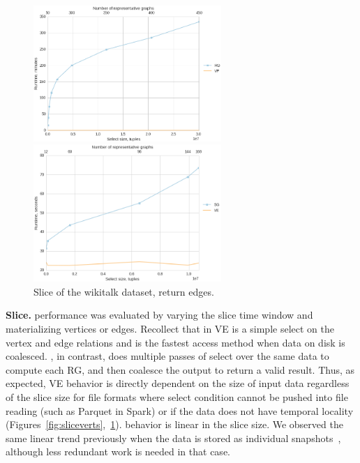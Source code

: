 \begin{figure}
\centering
\begin{minipage}{3.3in}
\centering
\includegraphics[width=2.8in]{figs/slice_ngrams_vertices_build11.png}
\caption{Slice of the nGrams dataset, return vertices.}
\label{fig:sliceverts}
\end{minipage}
\begin{minipage}{3.3in}
\centering
\includegraphics[width=2.8in]{figs/slice_wikitalk_edges_build11.png}
\caption{Slice of the wikitalk dataset, return edges.}
\label{fig:sliceedges}
\end{minipage}
\end{figure}

{\bf Slice.}   performance was evaluated by varying the
slice time window and materializing vertices or edges.  Recollect that
in VE  is a simple select on the vertex and edge
relations and is the fastest access method when data on disk is
coalesced.  \sg, in contrast, does multiple passes of select over the
same data to compute each RG, and then coalesce the output to return a
valid result.  Thus, as expected, VE behavior is directly dependent on
the size of input data regardless of the slice size for file formats
where select condition cannot be pushed into file reading (such as
Parquet in Spark) or if the data does not have temporal locality
(Figures~\ref{fig:sliceverts},~\ref{fig:sliceedges}).  \sg behavior is
linear in the slice size.  We observed the same linear trend
previously when the data is stored as individual
snapshots~\cite{PortalarXiv2016}, although less redundant work is
needed in that case.

